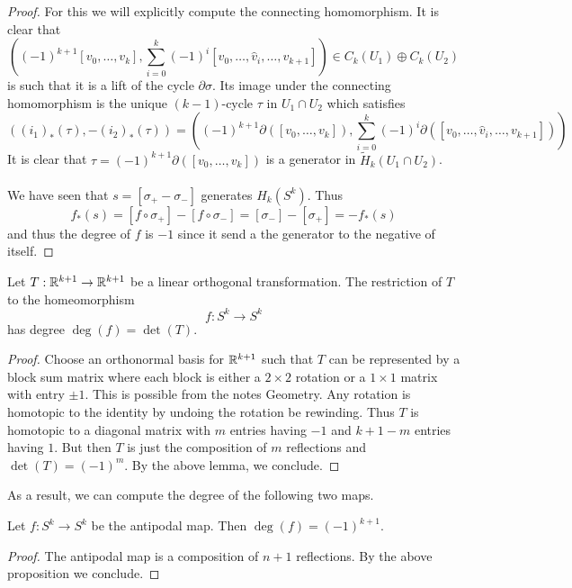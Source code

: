 \documentclass[a4paper]{article}
\begin{document}
\begin{lmm}{}{}
\begin{proof}
For this we will explicitly compute the connecting homomorphism. It is clear that $$\left((-1)^{k+1}[v_0,\dots,v_k],\sum_{i=0}^k(-1)^i[v_0,\dots,\hat{v}_i,\dots,v_{k+1}]\right)\in C_k(U_1)\oplus C_k(U_2)$$ is such that it is a lift of the cycle $\partial\sigma$. Its image under the connecting homomorphism is the unique $(k-1)$-cycle $\tau$ in $U_1\cap U_2$ which satisfies $$\left((i_1)_\ast(\tau),-(i_2)_\ast(\tau)\right)=\left((-1)^{k+1}\partial([v_0,\dots,v_k]),\sum_{i=0}^k(-1)^i\partial([v_0,\dots,\hat{v}_i,\dots,v_{k+1}])\right)$$ It is clear that $\tau=(-1)^{k+1}\partial([v_0,\dots,v_k])$ is a generator in $\widetilde{H}_k(U_1\cap U_2)$. \\~\\

We have seen that $s=[\sigma_+-\sigma_-]$ generates $H_k(S^k)$. Thus $$f_\ast(s)=[f\circ\sigma_+]-[f\circ\sigma_-]=[\sigma_-]-[\sigma_+]=-f_\ast(s)$$ and thus the degree of $f$ is $-1$ since it send a the generator to the negative of itself. 
\end{proof}
\end{lmm}

\begin{prp}{}{} Let $T:\mathbb{R}^{k+1}\to\mathbb{R}^{k+1}$ be a linear orthogonal transformation. The restriction of $T$ to the homeomorphism $$f:S^k\to S^k$$ has degree $\deg(f)=\det(T)$. \tcbline
\begin{proof}
Choose an orthonormal basis for $\mathbb{R}^{k+1}$ such that $T$ can be represented by a block sum matrix where each block is either a $2\times 2$ rotation or a $1\times 1$ matrix with entry $\pm 1$. This is possible from the notes Geometry. Any rotation is homotopic to the identity by undoing the rotation be rewinding. Thus $T$ is homotopic to a diagonal matrix with $m$ entries having $-1$ and $k+1-m$ entries having $1$. But then $T$ is just the composition of $m$ reflections and $\det(T)=(-1)^m$. By the above lemma, we conclude. 
\end{proof}
\end{prp}

As a result, we can compute the degree of the following two maps. 

\begin{crl}{}{} Let $f:S^k\to S^k$ be the antipodal map. Then $\deg(f)=(-1)^{k+1}$. \tcbline
\begin{proof}
The antipodal map is a composition of $n+1$ reflections. By the above proposition we conclude. 
\end{proof}
\end{crl}
\end{document}
